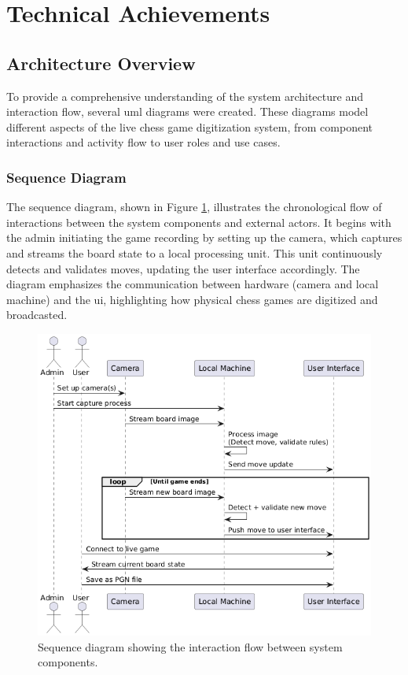 \section{Technical Achievements}

\subsection{Architecture Overview}
\label{subsec:diagrams}

To provide a comprehensive understanding of the system architecture and interaction flow, several \gls{uml} diagrams were created. These diagrams model different aspects of the live chess game digitization system, from component interactions and activity flow to user roles and use cases.

\subsubsection*{Sequence Diagram}
\label{subsubsec:sequence-diagram}

The sequence diagram, shown in Figure \ref{fig:sequence}, illustrates the chronological flow of interactions between the system components and external actors. It begins with the admin initiating the game recording by setting up the camera, which captures and streams the board state to a local processing unit. This unit continuously detects and validates moves, updating the user interface accordingly. The diagram emphasizes the communication between hardware (camera and local machine) and the \gls{ui}, highlighting how physical chess games are digitized and broadcasted.


\begin{figure}[h!]
    \centering
    \includegraphics[width=\linewidth]{figures/results/uml/sequence.png}
    \caption[Sequence diagram]{Sequence diagram showing the interaction flow between system components.}
    \label{fig:sequence}
\end{figure}

